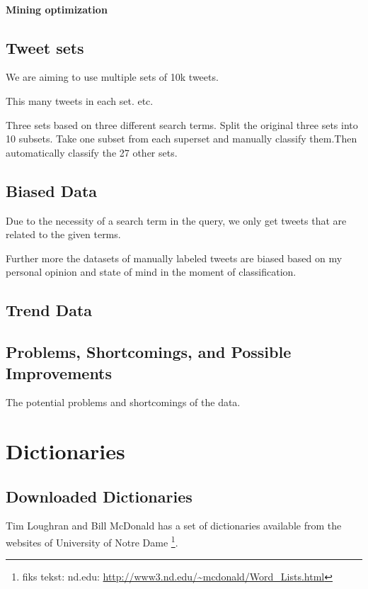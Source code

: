 \paragraph{Mining optimization}

\subsection{Tweet sets}
We are aiming to use multiple sets of 10k tweets. 

This many tweets in each set. etc. 

Three sets based on three different search terms.
Split the original three sets into 10 subsets. 
Take one subset from each superset and manually classify them.Then
automatically classify the 27 other sets.  

\subsection{Biased Data}
Due to the necessity of a search term in the query, we only get tweets that are
related to the given terms.

Further more the datasets of manually labeled tweets are biased based on my
personal opinion and state of mind in the moment of classification.  

\subsection{Trend Data}

\subsection{Problems, Shortcomings, and Possible Improvements}
The potential problems and shortcomings of the data. 

\section{Dictionaries}\label{sec:dict}


\subsection{Downloaded Dictionaries}
Tim Loughran and Bill McDonald has a set of dictionaries available from the
websites of University of Notre Dame \footnote{fiks tekst: nd.edu:
\url{http://www3.nd.edu/~mcdonald/Word_Lists.html}}. 


